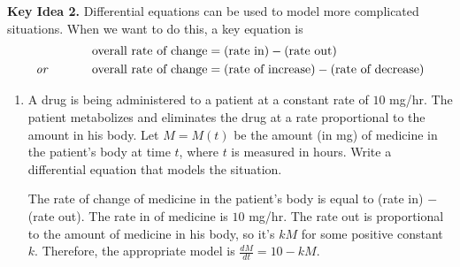 \documentclass[main]{subfiles}
\begin{document}
\probonly{\newpage}

  \begin{framed}
    \textbf{Key Idea 2.}  Differential equations can be used to model more
    complicated situations.  When we want to do this, a key equation is
    \begin{align*}
      \text{overall rate of change} &= \text{(rate in)} - \text{(rate out)} \\
      \textit{or} \hspace{0.5in} \text{overall rate of change} &= \text{(rate of
        increase)} - \text{(rate of decrease)}
    \end{align*}
  \end{framed}


\begin{enumerate}[resume]
\item 




  \begin{problem}[1in]
    A drug is being administered to a patient at a constant rate of $10$
    mg/hr.  The patient metabolizes and eliminates the drug at a rate
    proportional to the amount in his body. Let $M = M(t)$ be the amount
    (in mg) of medicine in the patient's body at time $t$, where $t$ is
    measured in hours.  Write a differential equation that models the
    situation.
  \end{problem}

  \begin{solution}
    The rate of change of medicine in the patient's body is equal to (rate
    in) $-$ (rate out).  The rate in of medicine is $10$ mg/hr.  The rate
    out is proportional to the amount of medicine in his body, so it's
    $kM$ for some positive constant $k$.  Therefore, the appropriate model
    is $\boxed{\frac{dM}{dt} = 10 - kM}$.
  \end{solution}


\end{enumerate}
\end{document}
